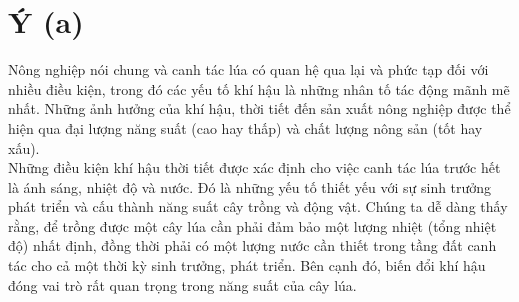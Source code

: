 \documentclass[12pt]{report}
\begin{document}
\section{Ý (a)} %

\begin{flushleft}
	Nông nghiệp nói chung và canh tác lúa có quan hệ qua lại và phức tạp đối với nhiều điều kiện, trong đó các yếu tố khí hậu là những nhân tố tác động mãnh mẽ nhất. Những ảnh hưởng của khí hậu, thời tiết đến sản xuất nông nghiệp được thể hiện qua đại lượng năng suất (cao hay thấp) và chất lượng nông sản (tốt hay xấu).
	\\[\baselineskip]

	Những điều kiện khí hậu thời tiết được xác định cho việc canh tác lúa trước hết là ánh sáng, nhiệt độ và nước. Đó là những yếu tố thiết yếu với sự sinh trưởng phát triển và cấu thành năng suất cây trồng và động vật. Chúng ta dễ dàng thấy rằng, để trồng được một cây lúa cần phải đảm bảo một lượng nhiệt (tổng nhiệt độ) nhất định, đồng thời phải có một lượng nước cần thiết trong tầng đất canh tác cho cả một thời kỳ sinh trưởng, phát triển. Bên cạnh đó, biến đổi khí hậu đóng vai trò rất quan trọng trong năng suất của cây lúa.
\end{flushleft}
\end{document}
